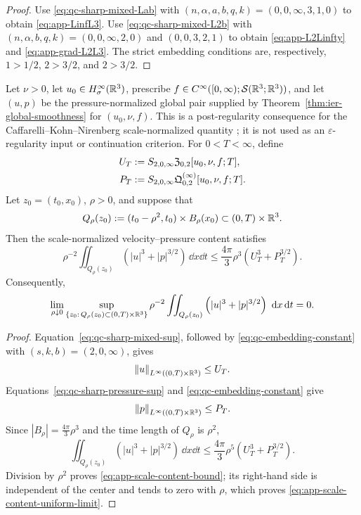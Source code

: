 \begin{proof}
Use \eqref{eq:qc-sharp-mixed-Lab} with
\((n,\alpha,a,b,q,k)=(0,0,\infty,3,1,0)\) to obtain
\eqref{eq:app-LinfL3}.  Use \eqref{eq:qc-sharp-mixed-L2b} with
\((n,\alpha,b,q,k)=(0,0,\infty,2,0)\) and
\((0,0,3,2,1)\) to obtain \eqref{eq:app-L2Linfty} and
\eqref{eq:app-grad-L2L3}.  The strict embedding conditions are,
respectively, \(1>1/2\), \(2>3/2\), and \(2>3/2\).
\end{proof}

\begin{corollary}
\label{thm:app-scale-content-extinction}
Let \(\nu>0\), let \(u_0\in H^\infty_\sigma(\mathbb R^3)\), prescribe
\(f\in C^\infty([0,\infty);\mathcal S(\mathbb R^3;\mathbb R^3))\), and let \((u,p)\) be
the pressure-normalized global pair supplied by
Theorem~\ref{thm:ier-global-smoothness} for \((u_0,\nu,f)\).  This is a post-regularity
consequence for the Caffarelli--Kohn--Nirenberg scale-normalized quantity
\cite{CKN1982}; it is not used as an \(\varepsilon\)-regularity input or
continuation criterion.
For \(0<T<\infty\), define
\begin{align}
 U_T&:=S_{2,0,\infty}\mathfrak Z_{0,2}[u_0,\nu,f;T],\notag\\
 P_T&:=S_{2,0,\infty}
 \mathfrak Q^{(\infty)}_{0,2}[u_0,\nu,f;T].
 \label{eq:app-scale-content-majorants}
\end{align}
Let \(z_0=(t_0,x_0)\), \(\rho>0\), and suppose that
\[
 Q_\rho(z_0):=(t_0-\rho^2,t_0)\times B_\rho(x_0)
 \subset(0,T)\times\mathbb R^3.
\]
Then the scale-normalized velocity--pressure content satisfies
\begin{equation}
 \rho^{-2}\iint_{Q_\rho(z_0)}
 \left(|u|^3+|p|^{3/2}\right)\,\dd x\dd t
 \le\frac{4\pi}{3}\rho^3
 \left(U_T^3+P_T^{3/2}\right).
 \label{eq:app-scale-content-bound}
\end{equation}
Consequently,
\begin{equation}
 \lim_{\rho\downarrow0}
 \sup_{\{z_0:\,Q_\rho(z_0)\subset(0,T)\times\mathbb R^3\}}
 \rho^{-2}\iint_{Q_\rho(z_0)}
 \left(|u|^3+|p|^{3/2}\right)\,\,\mathrm d x\,\mathrm d t=0.
 \label{eq:app-scale-content-uniform-limit}
\end{equation}
\end{corollary}

\begin{proof}
Equation~\eqref{eq:qc-sharp-mixed-sup}, followed by
\eqref{eq:qc-embedding-constant} with \((s,k,b)=(2,0,\infty)\), gives
\[
 \left\lVert u\right\rVert_{L^\infty((0,T)\times\mathbb R^3)}\le U_T.
\]
Equations~\eqref{eq:qc-sharp-pressure-sup} and
\eqref{eq:qc-embedding-constant} give
\[
 \left\lVert p\right\rVert_{L^\infty((0,T)\times\mathbb R^3)}\le P_T.
\]
Since \(|B_\rho|=\frac{4\pi}{3}\rho^3\) and the time length of
\(Q_\rho\) is \(\rho^2\),
\[
 \iint_{Q_\rho(z_0)}\left(|u|^3+|p|^{3/2}\right)\,\dd x\dd t
 \le\frac{4\pi}{3}\rho^5
 \left(U_T^3+P_T^{3/2}\right).
\]
Division by \(\rho^2\) proves \eqref{eq:app-scale-content-bound}; its
right-hand side is independent of the center and tends to zero with
\(\rho\), which proves \eqref{eq:app-scale-content-uniform-limit}.
\end{proof}

